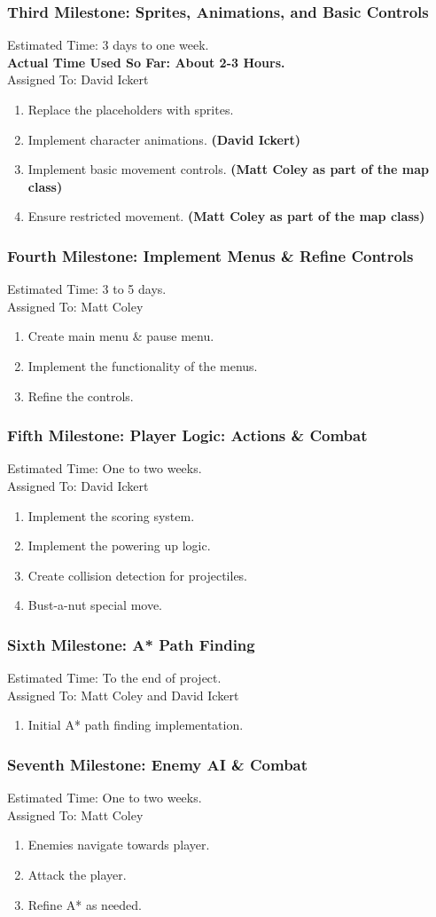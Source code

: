 \documentclass[]{article}
\newcommand*\good{\item[\Checkmark]}
\newcommand*\bad{\item[\XSolidBrush]}
\begin{document}
		\subsubsection{Third Milestone: Sprites, Animations, and Basic Controls}		
		Estimated Time: 3 days to one week.\\
		\textbf{Actual Time Used So Far: About 2-3 Hours.}\\
		Assigned To: David Ickert
		\begin{enumerate}
			\bad Replace the placeholders with sprites.
			\good Implement character animations. \textbf{(David Ickert)}
			\good Implement basic movement controls. \textbf{(Matt Coley as part of the map class)}
			\good Ensure restricted movement. \textbf{(Matt Coley as part of the map class)}
		\end{enumerate}			
		\subsubsection{Fourth Milestone: Implement Menus \& Refine Controls}
		Estimated Time: 3 to 5 days.\\
		Assigned To: Matt Coley 	
		\begin{enumerate}
			\bad Create main menu \& pause menu.
			\bad Implement the functionality of the menus.
			\bad Refine the controls.
		\end{enumerate}			
		\subsubsection{Fifth Milestone: Player Logic: Actions \& Combat}
		Estimated Time: One to two weeks.\\
		Assigned To: David Ickert
		\begin{enumerate}
			\bad Implement the scoring system.
			\bad Implement the powering up logic.
			\bad Create collision detection for projectiles.
			\bad Bust-a-nut special move.
		\end{enumerate}			
		\subsubsection{Sixth Milestone: A* Path Finding}
		Estimated Time: To the end of project.\\
		Assigned To: Matt Coley and David Ickert
		\begin{enumerate}
			\bad Initial A* path finding implementation.
		\end{enumerate}			
		\subsubsection{Seventh Milestone: Enemy AI \& Combat}
		Estimated Time: One to two weeks.\\
		Assigned To: Matt Coley
		\begin{enumerate}
			\bad Enemies navigate towards player.
			\bad Attack the player.
			\bad Refine A* as needed.
		\end{enumerate}		
\end{document}
